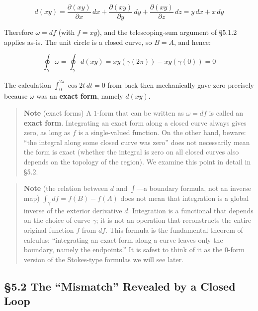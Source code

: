 \documentclass[a4paper,12pt,openany]{book}
\begin{document}
\[d(xy) = \frac{\partial (xy)}{\partial x}\,dx + \frac{\partial (xy)}{\partial y}\,dy + \frac{\partial (xy)}{\partial z}\,dz = y\,dx + x\,dy\]

Therefore \(\omega = df\) (with \(f = xy\)), and the telescoping-sum
argument of §5.1.2 applies as-is. The unit circle is a closed curve, so
\(B = A\), and hence:

\[\oint_\gamma \omega = \oint_\gamma d(xy) = xy(\gamma(2\pi))-xy(\gamma(0))=0\]

The calculation \(\int_0^{2\pi} \cos 2t\,dt = 0\) from back then
mechanically gave zero precisely because \(\omega\) was an
\textbf{exact form}, namely \(d(xy)\).

\begin{quote}
\textbf{Note} (exact forms) A \(1\)-form that can be written as
\(\omega = df\) is called an \textbf{exact form}. Integrating an exact
form along a closed curve always gives zero, as long as \(f\) is a
single-valued function. On the other hand, beware: ``the integral along
some closed curve was zero'' does not necessarily mean the form is exact
(whether the integral is zero on all closed curves also depends on the
topology of the region). We examine this point in detail in §5.2.
\end{quote}

\begin{quote}
\textbf{Note} (the relation between \(d\) and \(\int\)—a boundary
formula, not an inverse map) \(\int_\gamma df = f(B)-f(A)\) does not
mean that integration is a global inverse of the exterior derivative
\(d\). Integration is a functional that depends on the choice of curve
\(\gamma\); it is not an operation that reconstructs the entire original
function \(f\) from \(df\). This formula is the fundamental theorem of
calculus: ``integrating an exact form along a curve leaves only the
boundary, namely the endpoints.'' It is safest to think of it as the
\(0\)-form version of the Stokes-type formulas we will see later.
\end{quote}

\par\vspace{0.35em}\par

\hypertarget{the-mismatch-revealed-by-a-closed-loop}{%
\subsection{§5.2 The ``Mismatch'' Revealed by a Closed
Loop}\label{the-mismatch-revealed-by-a-closed-loop}}
\end{document}
